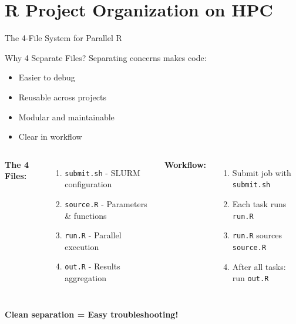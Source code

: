 \documentclass[aspectratio=169]{beamer}
\begin{document}
\section{R Project Organization on HPC}

\begin{frame}{The 4-File System for Parallel R}
\begin{block}{Why 4 Separate Files?}
Separating concerns makes code:
\begin{itemize}
    \item Easier to debug
    \item Reusable across projects
    \item Modular and maintainable
    \item Clear in workflow
\end{itemize}
\end{block}

\vspace{0.5em}
\begin{columns}[T]
\textbf{The 4 Files:}
\begin{enumerate}
    \item \texttt{submit.sh} - SLURM configuration
    \item \texttt{source.R} - Parameters \& functions
    \item \texttt{run.R} - Parallel execution
    \item \texttt{out.R} - Results aggregation
\end{enumerate}

\textbf{Workflow:}
\begin{enumerate}
    \item Submit job with \texttt{submit.sh}
    \item Each task runs \texttt{run.R}
    \item \texttt{run.R} sources \texttt{source.R}
    \item After all tasks: run \texttt{out.R}
\end{enumerate}
\end{columns}

\vspace{0.5em}
\centering
\textcolor{ceciblue}{\textbf{Clean separation = Easy troubleshooting!}}
\end{frame}
\end{document}
